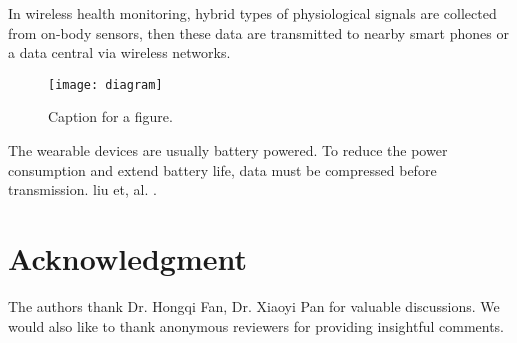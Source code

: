 \documentclass[twocolumn,letterpaper,10pt]{IEEEtran}
\begin{document}
In wireless health monitoring, hybrid types of physiological signals are collected
from on-body sensors, then these data are transmitted to nearby smart phones or a data central via wireless networks.

\begin{figure}[!htbp]
    \centering
    \texttt{[image: diagram]}
    \caption{Caption for a figure.}
\end{figure}

The wearable devices are usually battery powered. To reduce the power consumption and extend battery life,
data must be compressed before transmission. liu et, al. \cite{liu2013energy}.

\section*{Acknowledgment}
The authors thank Dr. Hongqi Fan, Dr. Xiaoyi Pan for valuable discussions.
We would also like to thank anonymous reviewers for providing insightful comments.

\ifCLASSOPTIONcaptionsoff
  \newpage
\fi




%






\end{document}
